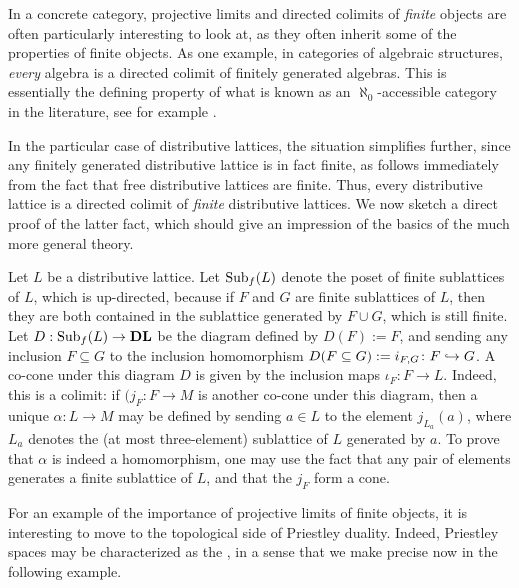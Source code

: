 In a concrete category, projective limits and directed colimits of \emph{finite} objects are often particularly interesting to look at, as they often inherit some of the properties of finite objects. As one example, in categories of algebraic structures, \emph{every} algebra is a directed colimit of finitely generated algebras. This is essentially the defining property of what is known as an $\aleph_0$-accessible category in the literature, see for example \cite{AdaRos1994}. 

In the particular case of distributive lattices, the situation simplifies further, since any finitely generated distributive lattice is in fact finite, as follows immediately from the fact that free distributive lattices are finite. Thus, every distributive lattice is a directed colimit of \emph{finite} distributive lattices. We now sketch a direct proof of the latter fact, which should give an impression of the basics of the much more general theory. 
\begin{example}\label{exa:DLasIndDLfin}
Let $L$ be a distributive lattice. Let $\mathrm{Sub}_f(L)$ denote the poset of finite
sublattices of $L$, which is up-directed, because if $F$ and $G$ are finite
sublattices of $L$, then they are both contained in the sublattice generated by
$F \cup G$, which is still finite. Let $D : \mathrm{Sub}_f(L) \to \mathbf{DL}$ be the
diagram defined by $D(F) := F$, and sending any inclusion $F \subseteq G$ to the
inclusion homomorphism $D(F \subseteq G) := i_{F,G} \colon F \hookrightarrow G$. A co-cone
under this diagram $D$ is given by the inclusion maps $\iota_F \colon F \to L$.
Indeed, this is a colimit: if $(j_F \colon F \to M$ is another co-cone under
this diagram, then a unique $\alpha \colon L \to M$ may be defined by sending $a
\in L$ to the element $j_{L_a}(a)$, where $L_a$ denotes the (at most
three-element) sublattice of $L$ generated by $a$. To prove that $\alpha$ is
indeed a homomorphism, one may use the fact that any pair of elements generates
a finite sublattice of $L$, and that the $j_F$ form a cone.  
\end{example}
For an example of the importance of projective limits of finite objects, it is
interesting to move to the topological side of Priestley duality. Indeed,
Priestley spaces may be characterized as the , in a
sense that we make precise now in the following example.
